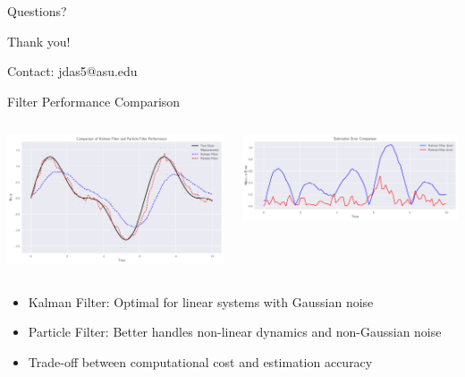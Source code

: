 \documentclass[aspectratio=169]{beamer}
\begin{document}
\begin{frame}{Questions?}
    \begin{center}
        \Huge Thank you!
        
        \vspace{1cm}
        \normalsize
        Contact: jdas5@asu.edu
    \end{center}
\end{frame}

\begin{frame}{Filter Performance Comparison}
    \begin{columns}
        \begin{column}{0.5\textwidth}
            \includegraphics[width=\textwidth]{filter_comparison.pdf}
        \end{column}
        \begin{column}{0.5\textwidth}
            \includegraphics[width=\textwidth]{error_comparison.pdf}
        \end{column}
    \end{columns}
    \vspace{0.3cm}
    \begin{itemize}
        \item Kalman Filter: Optimal for linear systems with Gaussian noise
        \item Particle Filter: Better handles non-linear dynamics and non-Gaussian noise
        \item Trade-off between computational cost and estimation accuracy
    \end{itemize}
\end{frame}
\end{document}
